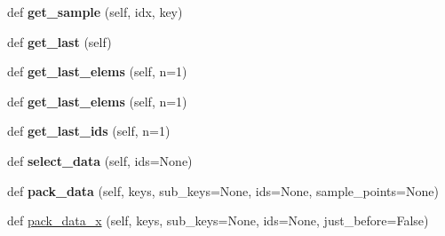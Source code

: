 \begin{DoxyCompactItemize}
def {\bfseries get\+\_\+sample} (self, idx, key)
\item 
\hypertarget{classaml__data__collec__utils_1_1core_1_1data__manager_1_1_data_manager_af4bb596cc3a288f35afdb98db7e372b7}{}\label{classaml__data__collec__utils_1_1core_1_1data__manager_1_1_data_manager_af4bb596cc3a288f35afdb98db7e372b7} 
def {\bfseries get\+\_\+last} (self)
\item 
\hypertarget{classaml__data__collec__utils_1_1core_1_1data__manager_1_1_data_manager_a5cb04122fbd4e9e68e3b58d4d66d1684}{}\label{classaml__data__collec__utils_1_1core_1_1data__manager_1_1_data_manager_a5cb04122fbd4e9e68e3b58d4d66d1684} 
def {\bfseries get\+\_\+last\+\_\+elems} (self, n=1)
\item 
\hypertarget{classaml__data__collec__utils_1_1core_1_1data__manager_1_1_data_manager_a5cb04122fbd4e9e68e3b58d4d66d1684}{}\label{classaml__data__collec__utils_1_1core_1_1data__manager_1_1_data_manager_a5cb04122fbd4e9e68e3b58d4d66d1684} 
def {\bfseries get\+\_\+last\+\_\+elems} (self, n=1)
\item 
\hypertarget{classaml__data__collec__utils_1_1core_1_1data__manager_1_1_data_manager_ac4cc59d510b13daaba59cda32ffd317d}{}\label{classaml__data__collec__utils_1_1core_1_1data__manager_1_1_data_manager_ac4cc59d510b13daaba59cda32ffd317d} 
def {\bfseries get\+\_\+last\+\_\+ids} (self, n=1)
\item 
\hypertarget{classaml__data__collec__utils_1_1core_1_1data__manager_1_1_data_manager_aa6b798ad60ef4414770f03cf5bf87d81}{}\label{classaml__data__collec__utils_1_1core_1_1data__manager_1_1_data_manager_aa6b798ad60ef4414770f03cf5bf87d81} 
def {\bfseries select\+\_\+data} (self, ids=None)
\item 
\hypertarget{classaml__data__collec__utils_1_1core_1_1data__manager_1_1_data_manager_af9f2964c695d4455f5b5151c7530a799}{}\label{classaml__data__collec__utils_1_1core_1_1data__manager_1_1_data_manager_af9f2964c695d4455f5b5151c7530a799} 
def {\bfseries pack\+\_\+data} (self, keys, sub\+\_\+keys=None, ids=None, sample\+\_\+points=None)
\item 
def \hyperlink{classaml__data__collec__utils_1_1core_1_1data__manager_1_1_data_manager_a51ac4a22f0965b1a7e72823bc138a70b}{pack\+\_\+data\+\_\+x} (self, keys, sub\+\_\+keys=None, ids=None, just\+\_\+before=False)
\item 
\hypertarget{classaml__data__collec__utils_1_1core_1_1data__manager_1_1_data_manager_a97caca399fab479e898d03742afe622d}{}\label{classaml__data__collec__utils_1_1core_1_1data__manager_1_1_data_manager_a97caca399fab479e898d03742afe622d} 

\end{DoxyCompactItemize}
